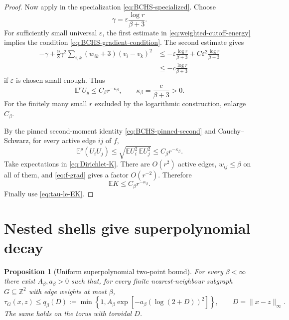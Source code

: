 \documentclass[11pt]{article}
\newtheorem{proposition}[theorem]{Proposition}
\theoremstyle{definition}
\theoremstyle{remark}
\newcommand{\EE}{\mathbb E}
\newcommand{\ZZ}{\mathbb Z}
\newcommand{\1}{\mathbf 1}
\begin{document}
\begin{proof}
Now apply \cite[Lemma~4.1]{BCHS} in the specialization \eqref{eq:BCHS-specialized}.  Choose
\begin{equation}
 \gamma=\varepsilon\frac{\log r}{\beta+3}.
\end{equation}
For sufficiently small universal $\varepsilon$, the first estimate in
\eqref{eq:weighted-cutoff-energy} implies the condition
\eqref{eq:BCHS-gradient-condition}.  The second estimate gives
\begin{equation}\begin{aligned}
 -\gamma+\frac98\gamma^2
 \sum_{i,k}(w_{ik}+3)(v_i-v_k)^2
 &\le
 -\varepsilon\frac{\log r}{\beta+3}
 +C\varepsilon^2\frac{\log r}{\beta+3}\\
 &\le -c\frac{\log r}{\beta+3}
\end{aligned}\end{equation}
if $\varepsilon$ is chosen small enough.  Thus
\begin{equation}\label{eq:Uy-poly}
 \EE^\rho U_y\le C_\beta r^{-\kappa_\beta},
 \qquad \kappa_\beta=\frac{c}{\beta+3}>0.
\end{equation}
For the finitely many small $r$ excluded by the logarithmic construction, enlarge
$C_\beta$.

By the pinned second-moment identity \eqref{eq:BCHS-pinned-second} and
Cauchy--Schwarz, for every active edge $ij$ of $f$,
\begin{equation}\label{eq:UiUj}
 \EE^\rho(U_iU_j)
 \le\sqrt{\EE U_i^2\,\EE U_j^2}
 \le C_\beta r^{-\kappa_\beta}.
\end{equation}
Take expectations in \eqref{eq:Dirichlet-K}.  There are $O(r^2)$ active edges,
$w_{ij}\le\beta$ on all of them, and \eqref{eq:f-grad} gives a factor $O(r^{-2})$.
Therefore
\begin{equation}
 \EE K\le C_\beta r^{-\kappa_\beta}.
\end{equation}
Finally use \eqref{eq:tau-le-EK}.
\end{proof}

\section{Nested shells give superpolynomial decay}\label{sec:superpoly}

\begin{proposition}[Uniform superpolynomial two-point bound]\label{prop:superpoly}
For every $\beta<\infty$ there exist $A_\beta,a_\beta>0$ such that, for every finite
nearest-neighbour subgraph $G\subseteq\ZZ^2$ with edge weights at most $\beta$,
\begin{equation}\label{eq:superpoly}
 \tau_G(x,z)
 \le q_\beta(D)
 :=\min\left\{1,
 A_\beta\exp[-a_\beta(\log(2+D))^2]\right\},
 \qquad D=\|x-z\|_\infty.
\end{equation}
The same holds on the torus with toroidal $D$.
\end{proposition}
\end{document}
